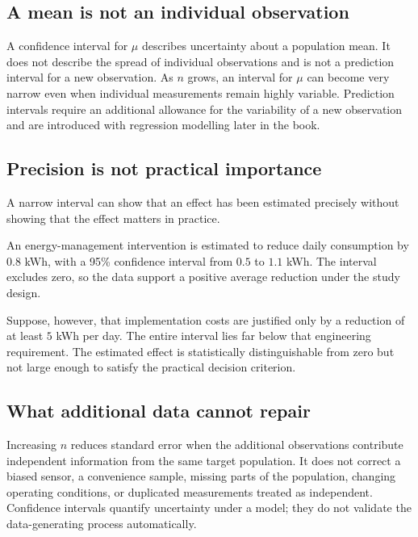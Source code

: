 \subsection{A mean is not an individual observation}

A confidence interval for $\mu$ describes uncertainty about a population mean. It does not describe the spread of individual observations and is not a prediction interval for a new observation. As $n$ grows, an interval for $\mu$ can become very narrow even when individual measurements remain highly variable. Prediction intervals require an additional allowance for the variability of a new observation and are introduced with regression modelling later in the book.

\subsection{Precision is not practical importance}

A narrow interval can show that an effect has been estimated precisely without showing that the effect matters in practice.

\begin{example}\par
An energy-management intervention is estimated to reduce daily consumption by $0.8$ kWh, with a 95\% confidence interval from $0.5$ to $1.1$ kWh. The interval excludes zero, so the data support a positive average reduction under the study design.

Suppose, however, that implementation costs are justified only by a reduction of at least $5$ kWh per day. The entire interval lies far below that engineering requirement. The estimated effect is statistically distinguishable from zero but not large enough to satisfy the practical decision criterion.
\end{example}

\subsection{What additional data cannot repair}

Increasing $n$ reduces standard error when the additional observations contribute independent information from the same target population. It does not correct a biased sensor, a convenience sample, missing parts of the population, changing operating conditions, or duplicated measurements treated as independent. Confidence intervals quantify uncertainty under a model; they do not validate the data-generating process automatically.


